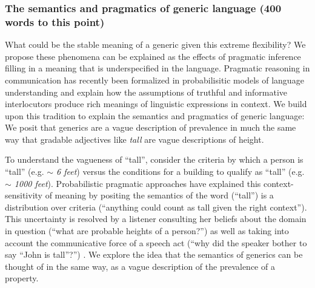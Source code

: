 \documentclass[10pt,letterpaper]{article}
\begin{document}
\subsubsection{The semantics and pragmatics of generic language  (400 words to this point)}

What could be the stable meaning of a generic given this extreme flexibility? 
We propose these phenomena can be explained as the effects of pragmatic inference filling in a meaning that is underspecified in the language. 
Pragmatic reasoning in communication has recently been formalized in probabilisitic models of language understanding \cite{Frank2012, Goodman2013, Franke2009} and explain how the assumptions of truthful and informative interlocutors \cite{Clark1996, Grice1975, Levinson2000} produce rich meanings of linguistic expressions in context. 
We build upon this tradition to explain the semantics and pragmatics of generic language: We posit that generics are a vague description of prevalence in much the same way that gradable adjectives like \emph{tall} are vague descriptions of height. 

To understand the vagueness of ``tall'', consider the criteria by which a person is ``tall'' (e.g. \emph{$\sim$ 6 feet}) versus the conditions for a building to qualify as ``tall'' (e.g. \emph{$\sim$ 1000 feet}).
Probabilistic pragmatic approaches have explained this context-sensitivity of meaning by positing the semantics of the word (``tall'') is a distribution over criteria (``anything could count as tall given the right context''). 
This uncertainty is resolved by a listener consulting her beliefs about the domain in question (``what are probable heights of a person?'') as well as taking into account the communicative force of a speech act (``why did the speaker bother to say ``John is tall''?'') \cite{Lassiter2013, Qing2014}.
We explore the idea that the semantics of generics can be thought of in the same way, as a vague description of the prevalence of a property.
%
%
%
%
%
\end{document}
